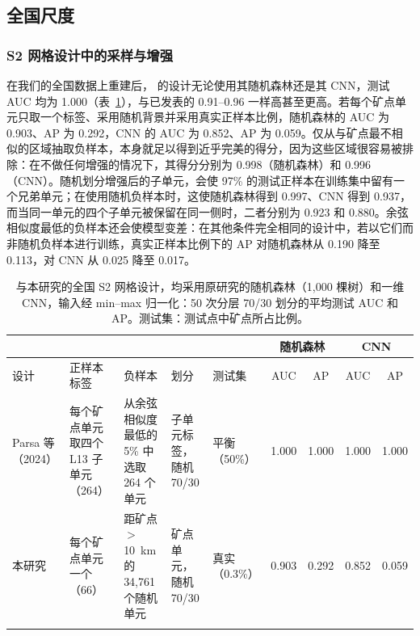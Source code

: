 \documentclass[pdflatex,sn-apa]{sn-jnl}
\begin{document}
\subsection{全国尺度}\label{sec:res-national}

\subsubsection{S2 网格设计中的采样与增强}\label{sec:res-ladder}

在我们的全国数据上重建后，\citet{Parsa2024} 的设计无论使用其随机森林还是其 CNN，测试 AUC 均为 1.000（表~\ref{tab:nat-design}），与已发表的 0.91--0.96 一样高甚至更高。若每个矿点单元只取一个标签、采用随机背景并采用真实正样本比例，随机森林的 AUC 为 0.903、AP 为 0.292，CNN 的 AUC 为 0.852、AP 为 0.059。仅从与矿点最不相似的区域抽取负样本，本身就足以得到近乎完美的得分，因为这些区域很容易被排除：在不做任何增强的情况下，其得分分别为 0.998（随机森林）和 0.996（CNN）。随机划分增强后的子单元，会使 97\% 的测试正样本在训练集中留有一个兄弟单元；在使用随机负样本时，这使随机森林得到 0.997、CNN 得到 0.937，而当同一单元的四个子单元被保留在同一侧时，二者分别为 0.923 和 0.880。余弦相似度最低的负样本还会使模型变差：在其他条件完全相同的设计中，若以它们而非随机负样本进行训练，真实正样本比例下的 AP 对随机森林从 0.190 降至 0.113，对 CNN 从 0.025 降至 0.017。

\begin{table}[t]
\caption{\citet{Parsa2024} 与本研究的全国 S2 网格设计，均采用原研究的随机森林（1,000 棵树）和一维 CNN，输入经 min--max 归一化：50 次分层 70/30 划分的平均测试 AUC 和 AP。测试集：测试点中矿点所占比例。}\label{tab:nat-design}
\scriptsize
\setlength{\tabcolsep}{2.5pt}
\begin{tabular*}{\textwidth}{@{\extracolsep\fill}>{\raggedright\arraybackslash}p{1.7cm}>{\raggedright\arraybackslash}p{2.4cm}>{\raggedright\arraybackslash}p{2.5cm}>{\raggedright\arraybackslash}p{1.8cm}>{\raggedright\arraybackslash}p{1.3cm}cccc}
\toprule
 & & & & & \multicolumn{2}{c}{随机森林} & \multicolumn{2}{c}{CNN} \\
\cmidrule{6-7}\cmidrule{8-9}
设计 & 正样本标签 & 负样本 & 划分 & 测试集 & AUC & AP & AUC & AP \\
\midrule
Parsa 等（2024） & 每个矿点单元取四个 L13 子单元（264） & 从余弦相似度最低的 5\% 中选取 264 个单元 & 子单元标签，随机 70/30 & 平衡（50\%） & 1.000 & 1.000 & 1.000 & 1.000 \\
本研究 & 每个矿点单元一个（66） & 距矿点 $>$10~km 的 34,761 个随机单元 & 矿点单元，随机 70/30 & 真实（0.3\%） & 0.903 & 0.292 & 0.852 & 0.059 \\
\botrule
\end{tabular*}
\end{table}
\end{document}

